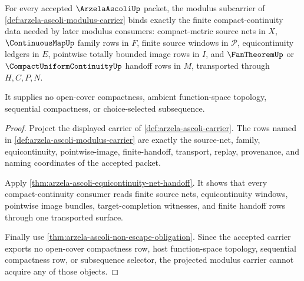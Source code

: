 \begin{theorem}
\label{thm:arzela-ascoli-modulus-namecert-obligations}
For every accepted $\ArzelaAscoliUp$ packet, the modulus subcarrier of \autoref{def:arzela-ascoli-modulus-carrier} binds exactly the finite compact-continuity data needed by later modulus consumers: compact-metric source nets in $X$, $\ContinuousMapUp$ family rows in $F$, finite source windows in $\mathcal{P}$, equicontinuity ledgers in $E$, pointwise totally bounded image rows in $I$, and $\FanTheoremUp$ or $\CompactUniformContinuityUp$ handoff rows in $M$, transported through $H,C,P,N$.

It supplies no open-cover compactness, ambient function-space topology, sequential compactness, or choice-selected subsequence.
\end{theorem}
\begin{proof}
Project the displayed carrier of \autoref{def:arzela-ascoli-carrier}. The rows named in \autoref{def:arzela-ascoli-modulus-carrier} are exactly the source-net, family, equicontinuity, pointwise-image, finite-handoff, transport, replay, provenance, and naming coordinates of the accepted packet.

Apply \autoref{thm:arzela-ascoli-equicontinuity-net-handoff}. It shows that every compact-continuity consumer reads finite source nets, equicontinuity windows, pointwise image bundles, target-completion witnesses, and finite handoff rows through one transported surface.

Finally use \autoref{thm:arzela-ascoli-non-escape-obligation}. Since the accepted carrier exports no open-cover compactness row, host function-space topology, sequential compactness row, or subsequence selector, the projected modulus carrier cannot acquire any of those objects.
\end{proof}

